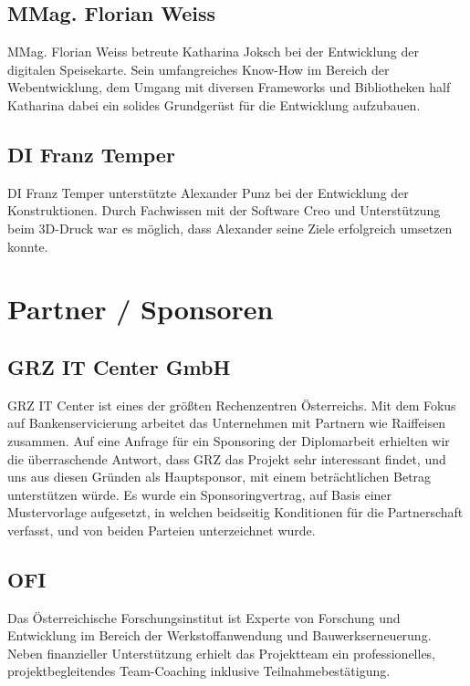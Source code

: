   \subsection*{MMag. Florian Weiss}
  MMag. Florian Weiss betreute Katharina Joksch bei der Entwicklung der digitalen Speisekarte. Sein umfangreiches
  Know-How im Bereich der Webentwicklung, dem Umgang mit diversen Frameworks und Bibliotheken half Katharina
  dabei ein solides Grundgerüst für die Entwicklung aufzubauen.

  \subsection*{DI Franz Temper}
  DI Franz Temper unterstützte Alexander Punz bei der Entwicklung der Konstruktionen. Durch Fachwissen mit
  der Software Creo und Unterstützung beim 3D-Druck war es möglich, dass Alexander seine Ziele erfolgreich
  umsetzen konnte.

\section{Partner / Sponsoren}

\subsection*{GRZ IT Center GmbH}
{GRZ IT Center\cite{grz}} ist eines der größten Rechenzentren Österreichs. Mit dem Fokus auf Bankenservicierung arbeitet das Unternehmen
mit Partnern wie Raiffeisen zusammen. Auf eine Anfrage für ein Sponsoring der Diplomarbeit erhielten wir die überraschende
Antwort, dass GRZ das Projekt sehr interessant findet, und uns aus diesen Gründen als Hauptsponsor, mit einem beträchtlichen Betrag
unterstützen würde.
Es wurde ein Sponsoringvertrag, auf Basis einer Mustervorlage aufgesetzt, in welchen beidseitig Konditionen für die Partnerschaft
verfasst, und von beiden Parteien unterzeichnet wurde.

\subsection*{OFI}
{Das Österreichische Forschungsinstitut\cite{ofi}} ist Experte von Forschung und Entwicklung im Bereich der Werkstoffanwendung
und Bauwerkserneuerung. Neben finanzieller Unterstützung erhielt das Projektteam
ein professionelles, projektbegleitendes Team-Coaching inklusive Teilnahmebestätigung.

